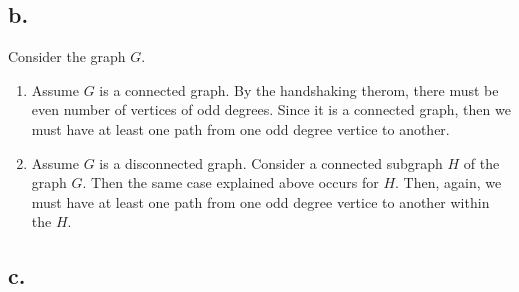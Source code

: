 \documentclass[12pt]{article}
\begin{document}
\subsection*{b.}

Consider the graph $G$.
\begin{enumerate}
\item
Assume $G$ is a connected graph. By the handshaking therom, there must be even number of vertices of odd degrees. Since it is a connected graph, then we must have at least one path from one odd degree vertice to another.
\item
Assume $G$ is a disconnected graph. Consider a connected subgraph $H$ of the graph $G$. Then the same case explained above occurs for $H$. Then, again, we must have at least one path from one odd degree vertice to another within the $H$.
\end{enumerate}

\subsection*{c.}
\end{document}

